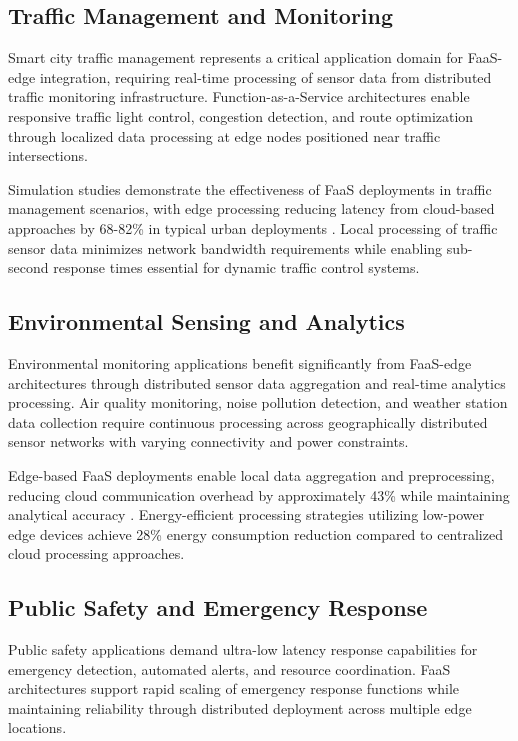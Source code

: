 \subsection{Traffic Management and Monitoring}

Smart city traffic management represents a critical application domain for FaaS-edge integration, requiring real-time processing of sensor data from distributed traffic monitoring infrastructure. Function-as-a-Service architectures enable responsive traffic light control, congestion detection, and route optimization through localized data processing at edge nodes positioned near traffic intersections.

Simulation studies demonstrate the effectiveness of FaaS deployments in traffic management scenarios, with edge processing reducing latency from cloud-based approaches by 68-82\% in typical urban deployments \cite{wang2021edgeserve}. Local processing of traffic sensor data minimizes network bandwidth requirements while enabling sub-second response times essential for dynamic traffic control systems.

\subsection{Environmental Sensing and Analytics}

Environmental monitoring applications benefit significantly from FaaS-edge architectures through distributed sensor data aggregation and real-time analytics processing. Air quality monitoring, noise pollution detection, and weather station data collection require continuous processing across geographically distributed sensor networks with varying connectivity and power constraints.

Edge-based FaaS deployments enable local data aggregation and preprocessing, reducing cloud communication overhead by approximately 43\% while maintaining analytical accuracy \cite{wang2021edgeserve}. Energy-efficient processing strategies utilizing low-power edge devices achieve 28\% energy consumption reduction compared to centralized cloud processing approaches.

\subsection{Public Safety and Emergency Response}

Public safety applications demand ultra-low latency response capabilities for emergency detection, automated alerts, and resource coordination. FaaS architectures support rapid scaling of emergency response functions while maintaining reliability through distributed deployment across multiple edge locations.

